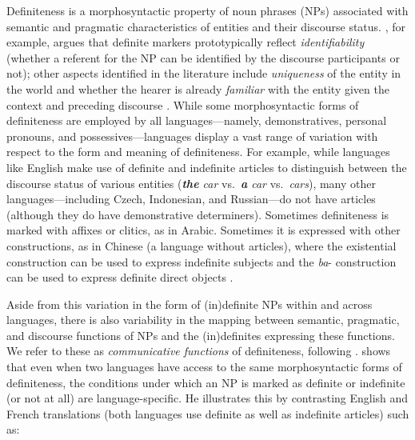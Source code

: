 \documentclass[11pt,letterpaper]{article}
\newcommand{\llbl}[1]{\mbox{\textsc{#1}}} %
\begin{document}
Definiteness is a morphosyntactic property of noun phrases (NPs) 
associated with semantic and pragmatic characteristics of entities 
and their discourse status. 
, for example, argues that definite markers prototypically reflect \emph{identifiability}
(whether a referent for the NP can be identified by the discourse participants or not); 
other aspects identified in the literature include \emph{uniqueness} of the entity in the world 
and whether the hearer is already \emph{familiar} with the entity given the context and preceding discourse \citep{roberts03,abbott06}.
While some morphosyntactic forms of definiteness are employed by all languages---namely, 
demonstratives, personal pronouns, and possessives---languages display a vast range of variation with respect to 
the form and meaning of definiteness. 
For example, while languages like English make use of definite and indefinite articles 
to distinguish between the discourse status of various entities ({\it \textbf{the} car} vs.~{\it \textbf{a} car} vs.~{\it cars}), 
many other languages---including Czech, Indonesian, and Russian---do not have articles
(although they do have demonstrative determiners).  
Sometimes definiteness is marked with affixes or clitics, as in Arabic. Sometimes it is expressed with other constructions,
as in Chinese (a language without articles), where the existential construction can be used to express indefinite subjects 
and the {\it ba}- construction can be used to express definite direct objects \citep{chen04}. 

Aside from this variation in the form of (in)definite NPs within and across languages, there is also variability 
in the mapping between semantic, pragmatic, and discourse %
functions of NPs and the (in)definites expressing these functions.   
We refer to these as {\em communicative functions} of definiteness, following \cite{bhatia14}.  
 shows that even when two languages have access to the same morphosyntactic forms of definiteness, the conditions under which an NP 
is marked as definite or indefinite (or not at all) 
are language-specific. He illustrates this by contrasting English and French translations (both languages use definite as well as indefinite articles) such as:
\end{document}
